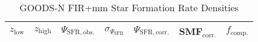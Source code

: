 % 
% 
% 

\begin{table}

\begin{center}

\caption{ %
    GOODS-N FIR+mm Star Formation Rate Densities %
    \label{Table_3} %
}

\begin{tabular}{ c c c c c c c }

        \hline
        
        $z_{\mathrm{low}}$                          &
        $z_{\mathrm{high}}$                         &
        $\Psi_{\mathrm{SFR},\mathrm{obs.}}$         &
        ${\sigma}_{\Psi_{\mathrm{SFR}}}$            &
        $\Psi_{\mathrm{SFR},\mathrm{corr.}}$        &
        SMF$_{\mathrm{corr.}}$                      &
        $f_{\mathrm{comp.}}$                 \\[2pt]
        
        
        \hline
        

\end{tabular}
\end{center}
\end{table}
